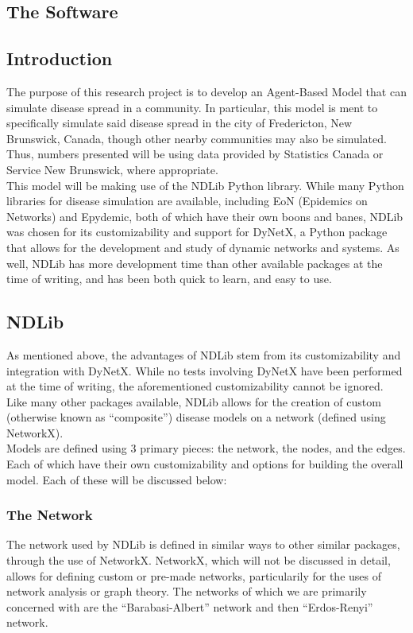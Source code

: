 \documentclass{article}
\numberwithin{equation}{section} %
\begin{document}
\begin{multicols}{2}
  \section{The Software}
  \subsection{Introduction}
  The purpose of this research project is to develop an Agent-Based Model that can simulate disease spread in a community. In particular, this model is ment to specifically simulate said disease spread in the city of Fredericton, New Brunswick, Canada, though other nearby communities may also be simulated. Thus, numbers presented will be using data provided by Statistics Canada or Service New Brunswick, where appropriate. \\

  This model will be making use of the NDLib Python library\cite{NDLib}. While many Python libraries for disease simulation are available, including EoN (Epidemics on Networks)\cite{EoN} and Epydemic, both of which have their own boons and banes, NDLib was chosen for its customizability and support for DyNetX, a Python package that allows for the development and study of dynamic networks and systems. As well, NDLib has more development time than other available packages at the time of writing, and has been both quick to learn, and easy to use.
  
  \subsection{NDLib}
  As mentioned above, the advantages of NDLib stem from its customizability and integration with DyNetX. While no tests involving DyNetX have been performed at the time of writing, the aforementioned customizability cannot be ignored. Like many other packages available, NDLib allows for the creation of custom (otherwise known as ``composite'') disease models on a network (defined using NetworkX). \\

  Models are defined using 3 primary pieces: the network, the nodes, and the edges. Each of which have their own customizability and options for building the overall model. Each of these will be discussed below:

  \subsubsection{The Network}
  The network used by NDLib is defined in similar ways to other similar packages, through the use of NetworkX. NetworkX, which will not be discussed in detail, allows for defining custom or pre-made networks, particularily for the uses of network analysis or graph theory. The networks of which we are primarily concerned with are the ``Barabasi-Albert''\cite{BANet} network and then ``Erdos-Renyi'' network\cite{ERNet}. \\


\end{multicols}
\end{document}
